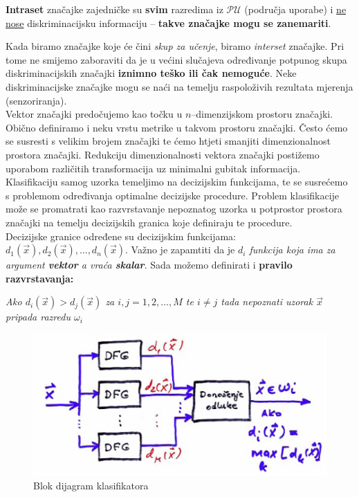 \documentclass{book}
\begin{document}
\textbf{Intraset} značajke zajedničke su  \textbf{svim} razredima iz
$\mathcal{PU}$ (područja uporabe) i \underline{ne nose}  diskriminacijsku
informaciju -- \textbf{takve značajke mogu se zanemariti}. \\

\newpage

 Kada biramo
značajke koje će čini \textit{skup za učenje}, biramo \textit{interset}
značajke. Pri tome ne smijemo zaboraviti da je u većini slučajeva  određivanje
potpunog skupa diskriminacijskih značajki \textbf{iznimno teško ili čak
nemoguće}. Neke diskriminacijske značajke mogu se naći na temelju raspoloživih 
rezultata mjerenja (senzoriranja). \\

Vektor značajki predočujemo kao točku u $n$--dimenzijskom prostoru značajki.
Obično definiramo i neku vrstu metrike u takvom prostoru značajki. Često ćemo se
susresti s velikim brojem značajki te ćemo htjeti smanjiti dimenzionalnost
prostora značajki. Redukciju dimenzionalnosti vektora značajki postižemo
uporabom različitih transformacija uz minimalni gubitak informacija. \\


Klasifikaciju samog uzorka temeljimo na decizijskim funkcijama, te se susrećemo
s problemom određivanja optimalne decizijske procedure. Problem  klasifikacije
može se promatrati kao razvrstavanje  nepoznatog uzorka u potprostor prostora
značajki na temelju decizijskih granica koje definiraju te procedure. \\


 Decizijske granice određene su decizijskim funkcijama:
$d_1(\vec{x}), d_2(\vec{x}), \ldots, d_n(\vec{x})$. Važno  je zapamtiti da je
\textit{$d_i$ funkcija koja ima za argument \textbf{vektor}  a vraća
\textbf{skalar}}. Sada možemo definirati i \textbf{pravilo razvrstavanja: } 
\begin{shaded}

\textit{ Ako $d_i(\vec{x}) > d_j(\vec{x})$ za $i,j = 1,2, \ldots,M$ te $i \neq
j$ tada nepoznati uzorak $\vec{x}$ pripada razredu $\omega_i$}
\end{shaded}


 \begin{figure}[H]
 \begin{center}
 \includegraphics[scale=0.5]{blok}
 \caption{Blok dijagram klasifikatora}
 \end{center}
 \end{figure}
\end{document}
